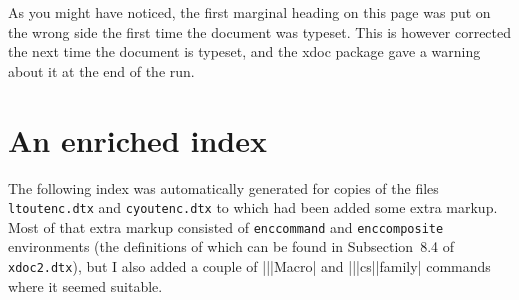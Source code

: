 \documentclass[twoside]{ltxdoc}
\DeclareRobustCommand\package[1]{\textsf{#1}}
\begin{document}
\endgroup

As you might have noticed, the first marginal heading on this page was 
put on the wrong side the first time the document was typeset. This is 
however corrected the next time the document is typeset, and the 
\package{xdoc} package gave a warning about it at the end of the run.


\section{An enriched index}

The following index was automatically generated for copies of the 
files \texttt{ltoutenc.dtx} and \texttt{cyoutenc.dtx} to which had 
been added some extra markup. Most of that extra markup consisted of 
\texttt{enccommand} and \texttt{enccomposite} environments (the 
definitions of which can be found in Subsection~8.4 of 
\texttt{xdoc2.dtx}), but I also added a couple of |\Describe|\-|Macro| 
and |\describe|\-|cs|\-|family| commands where it seemed suitable.


\let\listenvironmentitem=\item
\end{document}
